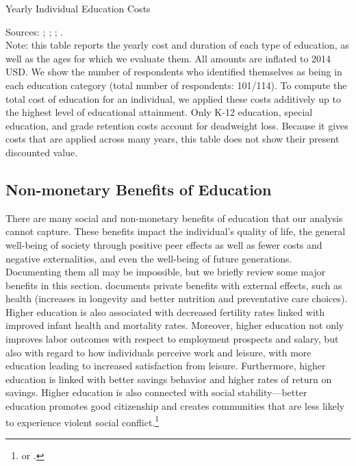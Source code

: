 \begin{table}[H]
\caption{Yearly Individual Education Costs} \label{tab:yearlyedu}
\centering
\begin{adjustbox}{max width=\textwidth}
\begin{threeparttable}
\footnotesize

\centering
\begin{tablenotes}%
\scriptsize
\item Sources: \citet{Snyder_Willow_2012_BOOK_NCES}; \citet{Hoenack_Weiler_1975_JHR}; \cite{Dhanidina_Griffith_1975_AEQ}; \cite{Freeman_1974_Occupational-Training_RES}. \\
 Note: this table reports the yearly cost and duration of each type of education, as well as the ages for which we evaluate them.  All amounts are inflated to 2014 USD.
We show the number of respondents who identified themselves as being in each education category (total number of respondents: 101/114). To compute the total cost of education for an individual, we applied these costs additively up to the highest level of educational attainment. Only K-12 education, special  education, and grade retention costs account for deadweight loss. Because it gives costs that are applied across many years, this table does not show their present discounted value.
\end{tablenotes}
\end{threeparttable}
\end{adjustbox}
\end{table}


\subsection{Non-monetary Benefits of Education}

\noindent There are many social and non-monetary benefits of education that our analysis cannot capture. These benefits impact the individual's quality of life, the general well-being of society through positive peer effects as well as fewer costs and negative externalities, and even the well-being of future generations. Documenting them all may be impossible, but we briefly review some major benefits in this section. \cite{Vila_2000_Non-Monetary-Benefits-Education} documents private benefits with external effects, such as health (increases in longevity and better nutrition and preventative care choices). Higher education is also associated with decreased fertility rates linked with improved infant health and mortality rates. Moreover, higher education not only improves labor outcomes with respect to employment prospects and salary, but also with regard to how individuals perceive work and leisure, with more education leading to increased satisfaction from leisure. Furthermore, higher education is linked with better savings behavior and higher rates of return on savings. Higher education is also connected with social stability---better education promotes good citizenship and creates communities that are less likely to experience violent social conflict.\footnote{\citet{Lochner_2011_Handbook} or \citet{Lochner_2011_NBER}.} \\